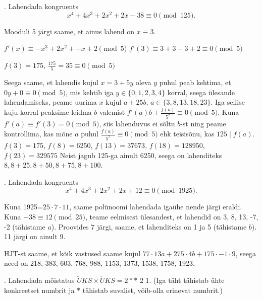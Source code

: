 \documentclass[a4paper, 10pt]{article}
\begin{document}
. Lahendada kongruents 
\[
x^4 + 4 x^3 + 2 x^2 + 2 x -38\equiv 0\pmod{125}.
\]

\smallskip
Mooduli 5 järgi saame, et ainus lahend on $x\equiv 3$. 

$f'(x)\equiv-x^3+2x^2+-x+2\pmod{5}$ $f'(3)\equiv3+3-3+2\equiv0 \pmod{5}$

$f(3)=175$, $\frac{175}{5}=35\equiv 0 \pmod{5}$

Seega saame, et lahendis kujul $x=3+5y$ oleva $y$ puhul peab kehtima, et $0y+0\equiv 0 \pmod{5}$, mis kehtib iga $y\in\{0,1,2,3,4\}$ korral, seega ülesande lahendamiseks, peame uurima $x$ kujul $a+25b$, $a\in\{3,8,13,18,23\}$. Iga sellise kuju korral peaksime leidma $b$ valemist $f'(a)b+\frac{f(a)}{5^2}\equiv 0 \pmod{5}$. Kuna $f'(a)\equiv f'(3)=0\pmod{5}$, siis lahenduvus ei sõltu $ b$-st ning peame kontrollima, kas mõne $a$ puhul $\frac{f(a)}{5^2}\equiv 0 \pmod{5}$ ehk teisisõnu, kas $125\mid f(a)$. $f(3)=175$, $f(8)=6250$, $f(13)=37673$, $f(18)=128950$, $f(23)=329575$ Neist jagub 125-ga ainult 6250, seega on lahenditeks $8,8+25,8+50,8+75,8+100$.


\bigskip

. Lahendada kongruents 
\[
x^4 + 4 x^3 + 2 x^2 + 2 x +12\equiv 0\pmod{1925}.
\]

\smallskip
Kuna 1925=$25\cdot 7\cdot 11$, saame polünoomi lahendada igaühe nende järgi eraldi.
Kuna $-38\equiv 12 \pmod {25}$, teame eelmisest ülesandest, et lahendid on 3, 8, 13, -7, -2 (tähistame $a$). 
Proovides 7 järgi, saame, et lahenditeks on 1 ja 5 (tähistame $b$).
11 järgi on ainult 9.

HJT-st saame, et kõik vastused saame kujul $77\cdot 13a+275\cdot 4b+175\cdot -1\cdot 9$, seega need on 218, 383, 603, 768, 988, 1153, 1373, 1538, 1758, 1923.
\bigskip

\pagebreak

. Lahendada m\~oistatus $\ddot{U}KS\times \ddot{U}KS=2\ast\ast\,\,2\,\,1$. (Iga täht t\"ahistab \"uhte konkreetset numbrit ja $\ast$ tähistab suvalist, võib-olla erinevat numbrit.)
\end{document}

